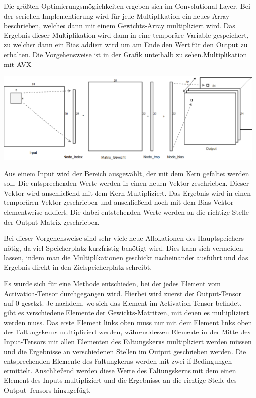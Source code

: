 \documentclass[../main.tex]{subfiles}
\begin{document}
Die größten Optimierungsmöglichkeiten ergeben sich im Convolutional Layer. Bei der seriellen Implementierung wird für jede Multiplikation ein neues Array beschrieben, welches dann mit einem Gewichts-Array multipliziert wird. Das Ergebnis dieser Multiplikation wird dann in eine temporäre Variable gespeichert, zu welcher dann ein Bias addiert wird um am Ende den Wert für den Output zu erhalten. Die Vorgehensweise ist in der Grafik unterhalb zu sehen.Multiplikation mit AVX

\includegraphics[width=\textwidth]{../images/Benz/Conv_Layer_Seriel.png} %

Aus einem Input wird der Bereich ausgewählt, der mit dem Kern gefaltet werden soll. Die entsprechenden Werte werden in einen neuen Vektor geschrieben. Dieser Vektor wird anschließend mit dem Kern Multipliziert. Das Ergebnis wird in einen temporären Vektor geschrieben und anschließend noch mit dem Bias-Vektor elementweise addiert. Die dabei entstehenden Werte werden an die richtige Stelle der Output-Matrix geschrieben.

Bei dieser Vorgehensweise sind sehr viele neue Allokationen des Hauptspeichers nötig, da viel Speicherplatz kurzfristig benötigt wird. Dies kann sich vermeiden lassen, indem man die Multiplikationen geschickt nacheinander ausführt und das Ergebnis direkt in den Zielspeicherplatz schreibt. 

Es wurde sich für eine Methode entschieden, bei der jedes Element vom Activation-Tensor durchgegangen wird. Hierbei wird zuerst der Output-Tensor auf 0 gesetzt. Je nachdem, wo sich das Element im Activation-Tensor befindet, gibt es verschiedene Elemente der Gewichts-Matritzen, mit denen es multipliziert werden muss. Das erste Element links oben muss nur mit dem Element links oben des Faltungskerns multipliziert werden, währenddessen Elemente in der Mitte des Input-Tensors mit allen Elementen des Faltungskerns multipliziert werden müssen und die Ergebnisse an verschiedenen Stellen im Output geschrieben werden. Die entsprechenden Elemente des Faltungkerns werden mit zwei if-Bedingungen ermittelt. Anschließend werden diese Werte des Faltungskerns mit dem einen Element des Inputs multipliziert und die Ergebnisse an die richtige Stelle des Output-Tensors hinzugefügt.
\end{document}
